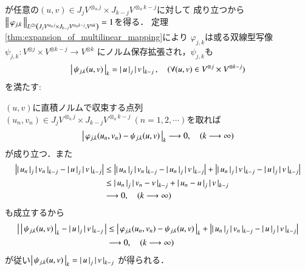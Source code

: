 	が任意の$(u,v) \in J_j V^{\otimes_a j} \times J_{k-j} V^{\otimes_a k-j}$に対して
	成り立つから$\Norm{\varphi_{j,k}}{\ContLn{J_j V^{\otimes_a j} \times J_{k-j} V^{\otimes_a k-j}}{V^{\otimes k}}{2}} = 1$を得る．
	定理\ref{thm:expansion_of_multilinear_mapping}により
	$\varphi_{j,k}$は或る双線型写像
	$\psi_{j,k}:V^{\otimes j} \times V^{\otimes k-j} \longrightarrow V^{\otimes k}$
	にノルム保存拡張され，$\psi_{j,k}$も
	\begin{align}
		\compcrossnorm{\psi_{j,k}(u,v)}{k} = \compcrossnorm{u}{j} \compcrossnorm{v}{k-j},
		\quad (\forall (u,v) \in V^{\otimes j} \times V^{\otimes k-j})
	\end{align}
	を満たす:
	
	\begin{prf}
		$(u,v)$に直積ノルムで収束する点列$(u_n,v_n) \in J_j V^{\otimes_a j} \times J_{k-j} V^{\otimes_a k-j}\ (n=1,2,\cdots)$を取れば
		\begin{align}
			\compcrossnorm{\varphi_{j,k}(u_n,v_n) - \psi_{j,k}(u,v)}{k} \longrightarrow 0,
			\quad (k \longrightarrow \infty)
		\end{align}
		が成り立つ．また
		\begin{align}
			\left| \compcrossnorm{u_n}{j} \compcrossnorm{v_n}{k-j} - 
			\compcrossnorm{u}{j} \compcrossnorm{v}{k-j} \right|
			&\leq \left| \compcrossnorm{u_n}{j} \compcrossnorm{v_n}{k-j} - 
			\compcrossnorm{u_n}{j} \compcrossnorm{v}{k-j} \right| 
			+ \left| \compcrossnorm{u_n}{j} \compcrossnorm{v}{k-j} - 
			\compcrossnorm{u}{j} \compcrossnorm{v}{k-j} \right| \\
			&\leq \compcrossnorm{u_n}{j} \compcrossnorm{v_n - v}{k-j} 
			+ \compcrossnorm{u_n - u}{j} \compcrossnorm{v}{k-j} \\
			&\longrightarrow 0, \quad (k \longrightarrow \infty)
		\end{align}
		も成立するから
		\begin{align}
			\left|\, \compcrossnorm{\psi_{j,k}(u,v)}{k} - \compcrossnorm{u}{j} \compcrossnorm{v}{k-j}\, \right|
			&\leq \compcrossnorm{\varphi_{j,k}(u_n,v_n) - \psi_{j,k}(u,v)}{k}
				+ \left| \compcrossnorm{u_n}{j} \compcrossnorm{v_n}{k-j} - 
			\compcrossnorm{u}{j} \compcrossnorm{v}{k-j} \right| \\
			& \longrightarrow 0, \quad (k \longrightarrow \infty)
		\end{align}
		が従い$\compcrossnorm{\psi_{j,k}(u,v)}{k} = \compcrossnorm{u}{j} \compcrossnorm{v}{k-j}$
		が得られる．
		\QED
	\end{prf}
	
